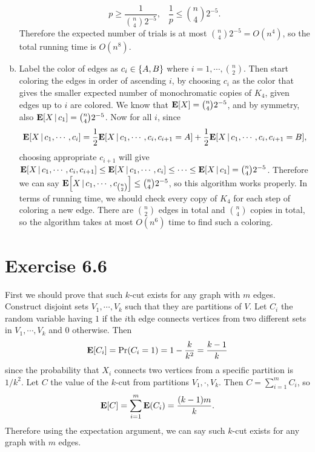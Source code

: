 \documentclass{article}
\begin{document}
\begin{enumerate}[(a)]
    \begin{equation*}
        p \geq \frac{1}{{n \choose 4}2^{-5}}, \;\;\; \frac{1}{p} \leq {n \choose 4}2^{-5}.
    \end{equation*}
    Therefore the expected number of trials is at most ${n \choose 4}2^{-5} = O(n^4)$, so the total running time is $O(n^8)$.
    \item Label the color of edges as $c_i \in \qty{A, B}$ where $i = 1, \cdots, {n \choose 2}$.
    Then start coloring the edges in order of ascending $i$, by choosing $c_i$ as the color that gives the smaller expected number of monochromatic copies of $K_4$, given edges up to $i$ are colored.
    We know that $\mathbf{E}\qty[X] = {n \choose 4}2^{-5}$, and by symmetry, also $\mathbf{E}\qty[X \,|\, c_1] = {n \choose 4}2^{-5}$.
    Now for all $i$, since 
    $$\mathbf{E}\qty[X \,|\, c_1 ,\cdots, c_i] = \frac{1}{2}\mathbf{E}\qty[X \,|\, c_1, \cdots, c_i, c_{i+1} = A] + \frac{1}{2}\mathbf{E}\qty[X \,|\, c_1, \cdots, c_i, c_{i+1} = B],$$
    choosing appropriate $c_{i+1}$ will give $\mathbf{E}\qty[X \,|\, c_1, \cdots, c_i, c_{i+1}] \leq \mathbf{E}\qty[X \,|\, c_1, \cdots, c_i] \leq \cdots \leq \mathbf{E}\qty[X \,|\, c_1] = {n \choose 4}2^{-5}$. 
    Therefore we can say $\mathbf{E}\qty[X \,|\, c_1, \cdots, c_{n \choose 2}] \leq {n \choose 4}2^{-5}$, so this algorithm works properly.
    In terms of running time, we should check every copy of $K_4$ for each step of coloring a new edge. 
    There are ${n \choose 2}$ edges in total and ${n \choose 4}$ copies in total, so the algorithm takes at most $O(n^6)$ time to find such a coloring.
\end{enumerate}

\section*{Exercise 6.6}
First we should prove that such $k$-cut exists for any graph with $m$ edges. 
Construct disjoint sets $V_1, \cdots, V_k$ such that they are partitions of $V$. 
Let $C_i$ the random variable having $1$ if the $i$th edge connects vertices from two different sets in $V_1, \cdots, V_k$ and $0$ otherwise.
Then 
$$\mathbf{E}\qty[C_i] = \mathrm{Pr}\qty(C_i = 1) = 1 - \frac{k}{k^2} = \frac{k-1}{k}$$
since the probability that $X_i$ connects two vertices from a specific partition is ${1}/{k^2}$.
Let $C$ the value of the $k$-cut from partitions $V_1, \cdot, V_k$. 
Then $C = \sum_{i=1}^{m}C_i$, so
$$\mathbf{E}\qty[C] = \sum_{i=1}^{m}\mathbf{E}\qty(C_i) = \frac{(k-1)m}{k}.$$
Therefore using the expectation argument, we can say such $k$-cut exists for any graph with $m$ edges.
\end{document}
